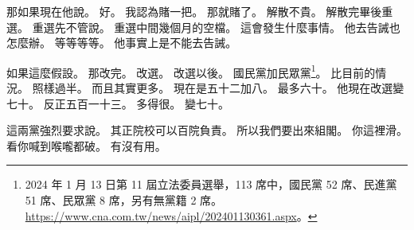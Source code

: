 \hypertarget{c01:cue:1408}{}那如果現在他說。
\hypertarget{c01:cue:1409}{}好。
\hypertarget{c01:cue:1410}{}我認為賭一把。
\hypertarget{c01:cue:1411}{}那就賭了。
\hypertarget{c01:cue:1412}{}解散不貴。
\hypertarget{c01:cue:1413}{}解散完畢後重選。
\hypertarget{c01:cue:1414}{}重選先不管說。
\hypertarget{c01:cue:1415}{}重選中間幾個月的空檔。
\hypertarget{c01:cue:1416}{}這會發生什麼事情。
\hypertarget{c01:cue:1417}{}他去告誡也怎麼辦。
\hypertarget{c01:cue:1418}{}等等等等。
\hypertarget{c01:cue:1419}{}他事實上是不能去告誡。

\hypertarget{c01:cue:1420}{}如果這麼假設。
\hypertarget{c01:cue:1421}{}那改完。
\hypertarget{c01:cue:1422}{}改選。
\hypertarget{c01:cue:1423}{}改選以後。
\hypertarget{c01:cue:1424}{}國民黨加民眾黨\footnote{2024 年 1 月 13 日第 11 屆立法委員選舉，113 席中，國民黨 52 席、民進黨 51 席、民眾黨 8 席，另有無黨籍 2 席。\url{https://www.cna.com.tw/news/aipl/202401130361.aspx}。}。
\hypertarget{c01:cue:1425}{}比目前的情況。
\hypertarget{c01:cue:1426}{}照樣過半。
\hypertarget{c01:cue:1427}{}而且其實更多。
\hypertarget{c01:cue:1428}{}現在是五十二加八。
\hypertarget{c01:cue:1429}{}最多六十。
\hypertarget{c01:cue:1430}{}他現在改選變七十。
\hypertarget{c01:cue:1431}{}反正五百一十三。
\hypertarget{c01:cue:1432}{}多得很。
\hypertarget{c01:cue:1433}{}變七十。

\hypertarget{c01:cue:1434}{}這兩黨強烈要求說。
\hypertarget{c01:cue:1435}{}其正院校可以百院負責。
\hypertarget{c01:cue:1436}{}所以我們要出來組閣。
\hypertarget{c01:cue:1437}{}你這裡滑。
\hypertarget{c01:cue:1438}{}看你喊到喉嚨都破。
\hypertarget{c01:cue:1439}{}有沒有用。

